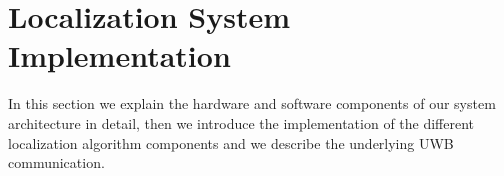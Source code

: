 
\chapter{Localization System Implementation} %

\label{Chapter5} %
In this section we explain the hardware and software components of our system architecture in detail, then we introduce the implementation of the different localization algorithm components and we describe the underlying UWB communication.


